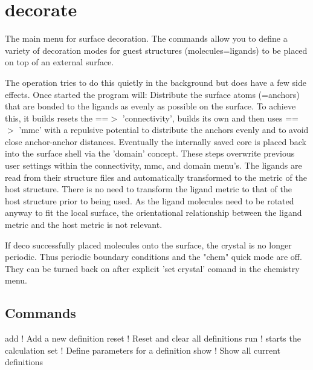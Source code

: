 \section{decorate}
\par
The main menu for surface decoration. 
The commands allow you to define a variety of decoration modes for 
guest structures (molecules=ligands) to be placed on top of an external 
surface. 
\par
The operation tries to do this quietly in the background but does have 
a few side effects. Once started the program will: 
Distribute the surface atoms (=anchors) that are bonded to the ligands as 
evenly as possible on the surface. To achieve this, it builds resets the 
==$> $ 'connectivity', builds its own and then uses ==$> $ 'mmc' with a repulsive 
potential to distribute the anchors evenly and to avoid close anchor-anchor 
distances. Eventually the internally saved core is placed back into the 
surface shell via the 'domain' concept. These steps overwrite previous user 
settings within the connectivity, mmc, and domain menu's. 
The ligands are read from their structure files 
and automatically transformed to the metric of the host structure. There is 
no need to transform the ligand metric to that of the host structure prior 
to being used. As the ligand molecules need to be rotated anyway to fit the 
local surface, the orientational relationship between the ligand metric and 
the host metric is not relevant. 
\par
If deco successfully placed molecules onto the surface, the crystal 
is no longer periodic. Thus periodic boundary conditions and 
the "chem" quick mode are off. They can be turned back on after 
explicit 'set crystal' comand in the chemistry menu. 
\par
\subsection*{Commands}
\begin{MacVerbatim}
add     ! Add a new definition
reset   ! Reset and clear all definitions
run     ! starts the calculation
set     ! Define parameters for a definition
show    ! Show all current definitions
\end{MacVerbatim}
